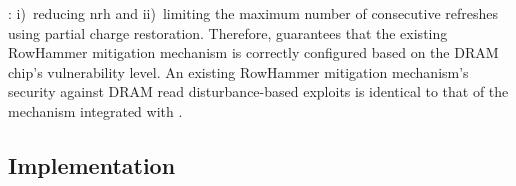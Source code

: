 : i)~reducing \gls{nrh} and ii)~limiting the maximum number of consecutive refreshes using partial charge restoration. Therefore, \X{} guarantees that the existing RowHammer mitigation mechanism is correctly configured based on the DRAM chip's vulnerability level. An existing RowHammer mitigation mechanism's security against DRAM read disturbance-based exploits is identical to that of the mechanism integrated with \X{}.




\subsection{ Implementation }
\label{sec:mech_implementation}


